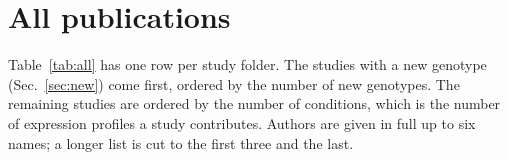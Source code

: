 
\section{All publications}\label{sec:all}

Table~\ref{tab:all} has one row per study folder. The \spellNNewStudies{}
studies with a new genotype (Sec.~\ref{sec:new}) come first, ordered by the
number of new genotypes. The remaining studies are ordered by the number of
conditions, which is the number of expression profiles a study contributes. Authors are given in full up
to six names; a longer list is cut to the first three and the last.


